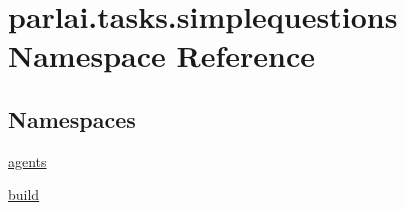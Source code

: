 \hypertarget{namespaceparlai_1_1tasks_1_1simplequestions}{}\section{parlai.\+tasks.\+simplequestions Namespace Reference}
\label{namespaceparlai_1_1tasks_1_1simplequestions}
\subsection*{Namespaces}
\begin{DoxyCompactItemize}
\item 
 \hyperlink{namespaceparlai_1_1tasks_1_1simplequestions_1_1agents}{agents}
\item 
 \hyperlink{namespaceparlai_1_1tasks_1_1simplequestions_1_1build}{build}
\end{DoxyCompactItemize}
